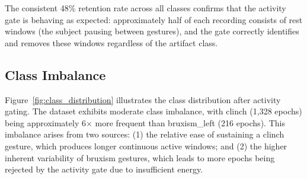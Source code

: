 The consistent 48\% retention rate across all classes confirms
that the activity gate is behaving as expected: approximately
half of each recording consists of rest windows (the subject
pausing between gestures), and the gate correctly identifies
and removes these windows regardless of the artifact class.

\subsection{Class Imbalance}

Figure~\ref{fig:class_distribution} illustrates the class
distribution after activity gating. The dataset exhibits
moderate class imbalance, with clinch (1{,}328 epochs) being
approximately 6$\times$ more frequent than bruxism\_left
(216 epochs). This imbalance arises from two sources: (1) the
relative ease of sustaining a clinch gesture, which produces
longer continuous active windows; and (2) the higher inherent
variability of bruxism gestures, which leads to more epochs
being rejected by the activity gate due to insufficient energy.

